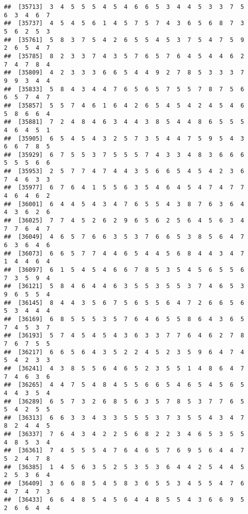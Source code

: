 \documentclass[
]{book}
\begin{document}
\begin{verbatim}
##  [35713]  3  4  5  5  5  4  5  4  6  6  5  3  4  4  5  3  3  7  5  6  3  4  6  7
##  [35737]  4  5  4  5  6  1  4  5  7  5  7  4  3  6  5  6  8  7  3  5  6  2  5  3
##  [35761]  5  8  3  7  5  4  2  6  5  5  4  5  3  7  5  4  7  5  9  2  6  5  4  7
##  [35785]  8  2  3  3  7  4  3  5  7  6  5  7  6  4  5  4  4  6  2  7  4  7  8  4
##  [35809]  4  2  3  3  3  6  6  5  4  4  9  2  7  8  5  3  3  3  7  9  9  3  4  4
##  [35833]  5  8  4  3  4  4  7  6  5  6  5  7  5  5  7  8  7  5  6  6  5  7  4  7
##  [35857]  5  5  7  4  6  1  6  4  2  6  5  4  5  4  2  4  5  4  6  5  8  6  6  4
##  [35881]  7  2  4  8  4  6  3  4  4  3  8  5  4  4  8  6  5  5  5  4  6  4  5  1
##  [35905]  6  5  4  5  4  3  2  5  7  3  5  4  4  7  5  9  5  4  3  6  6  7  8  5
##  [35929]  6  7  5  5  3  7  5  5  5  7  4  3  3  4  8  3  6  6  6  5  5  5  6  6
##  [35953]  2  5  7  7  4  7  4  4  3  5  6  6  5  4  5  4  2  3  6  7  4  6  3  3
##  [35977]  6  7  6  4  1  5  5  6  3  5  4  6  4  5  4  7  4  7  7  4  6  4  6  2
##  [36001]  6  4  4  5  4  3  4  7  6  5  5  4  3  8  7  6  3  6  4  4  3  6  2  6
##  [36025]  7  7  4  5  2  6  2  9  6  5  6  2  5  6  4  5  6  3  4  7  7  6  4  7
##  [36049]  4  6  5  7  6  6  3  5  3  7  6  6  5  3  8  5  6  4  7  6  3  6  4  6
##  [36073]  6  6  5  7  7  4  4  6  5  4  4  5  6  8  4  4  3  4  7  1  4  4  6  4
##  [36097]  6  1  5  4  5  4  6  6  7  8  5  3  5  4  5  6  5  5  6  7  3  5  9  4
##  [36121]  5  8  4  6  4  4  6  3  5  5  3  5  5  3  7  4  6  5  3  9  6  5  5  4
##  [36145]  8  4  4  3  5  6  7  5  6  5  5  6  4  7  2  6  6  5  6  5  3  4  4  4
##  [36169]  6  8  5  5  5  3  5  7  6  4  6  5  5  8  6  4  3  6  5  7  4  5  3  7
##  [36193]  5  7  4  5  4  5  4  3  6  3  3  7  7  6  4  6  2  7  8  7  6  7  5  5
##  [36217]  6  6  5  6  4  3  5  2  2  4  5  2  3  5  9  6  4  7  4  5  4  2  3  3
##  [36241]  4  3  8  5  5  6  4  6  5  2  3  5  5  1  4  8  6  4  7  7  4  6  3  6
##  [36265]  4  4  7  5  4  8  4  5  5  6  6  5  4  6  5  4  5  6  5  4  4  3  5  4
##  [36289]  6  5  7  3  2  6  8  5  6  3  5  7  8  5  3  7  7  6  5  5  4  2  5  5
##  [36313]  6  6  3  3  4  3  3  5  5  5  3  7  3  5  5  4  3  4  7  8  2  4  4  5
##  [36337]  7  6  4  3  4  2  2  5  6  8  2  2  3  4  6  5  3  5  5  4  8  5  3  4
##  [36361]  7  4  5  5  5  4  7  6  4  6  5  7  6  9  5  6  4  4  7  5  2  4  7  8
##  [36385]  1  4  5  6  3  5  2  5  3  5  3  6  4  4  2  5  4  4  5  2  5  3  6  4
##  [36409]  3  6  6  8  5  4  5  8  3  6  5  5  3  4  5  5  4  7  6  4  7  4  7  3
##  [36433]  6  6  4  8  5  4  5  6  4  4  8  5  5  4  3  6  6  9  5  2  6  6  4  4

\end{verbatim}
\end{document}
